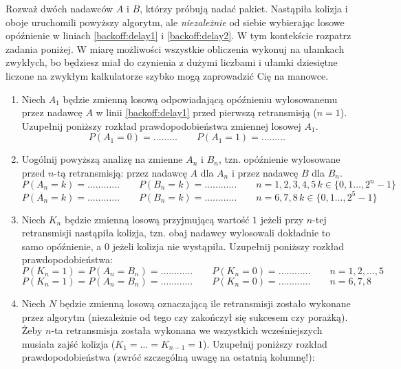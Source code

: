 \documentclass[twoside]{mwart}
\newcommand{\ans}[1]{}
\newenvironment{ansenv}{\comment}{\endcomment}
\newenvironment{ansenv}{\paragraph{Odpowiedź:}}{}
\newcommand{\ans}[1]{\begin{ansenv}#1\end{ansenv}}
\begin{document}
Rozważ dwóch nadawców $A$ i $B$, którzy próbują nadać pakiet.
Nastąpiła kolizja i oboje uruchomili powyższy algorytm, ale \emph{niezależnie} od siebie wybierając losowe opóźnienie w liniach \ref{backoff:delay1} i \ref{backoff:delay2}.
W tym kontekście rozpatrz zadania poniżej.
W miarę możliwości wszystkie obliczenia wykonuj na ułamkach zwykłych, bo będziesz miał do czynienia z dużymi liczbami i ułamki dziesiętne liczone na zwykłym kalkulatorze szybko mogą zaprowadzić Cię na manowce.
\begin{enumerate}
\item Niech $A_1$ będzie zmienną losową odpowiadającą opóźnieniu wylosowanemu przez nadawcę $A$ w linii \ref{backoff:delay1} przed pierwszą retransmisją ($n=1$).
Uzupełnij poniższy rozkład prawdopodobieństwa zmiennej losowej $A_1$.
\[ P(A_1=0)=\ldots\ldots\ldots \qquad P(A_1=1)=\ldots\ldots\ldots \]
\ans{\[P(A_1=0)=P(A_1=1)=\frac{1}{2}\]}
\item Uogólnij powyższą analizę na zmienne $A_n$ i $B_n$, tzn. opóźnienie wylosowane przed $n$-tą retransmisją: przez nadawcę $A$ dla $A_n$ i przez nadawcę $B$ dla $B_n$.
\[ P(A_n=k)=\ldots\ldots\ldots\ldots \qquad P(B_n=k)=\ldots\ldots\ldots\ldots \qquad n=1, 2, 3, 4, 5\, k\in\{0, 1 \ldots, 2^n-1\} \]
\[ P(A_n=k)=\ldots\ldots\ldots\ldots \qquad P(B_n=k)=\ldots\ldots\ldots\ldots \qquad n=6, 7, 8\, k\in\{0, 1 \ldots, 2^5-1\} \]
\ans{
	\[P(A_n=k)=P(B_n=k)=\frac{1}{2^n} \quad n\leq 5 \]
	\[P(A_n=k)=P(B_n=k)=\frac{1}{2^5} \quad n> 5 \]
}
\item Niech $K_n$ będzie zmienną losową przyjmującą wartość $1$ jeżeli przy $n$-tej retransmisji nastąpiła kolizja, tzn. obaj nadawcy wylosowali dokładnie to samo opóźnienie, a $0$ jeżeli kolizja nie wystąpiła.
Uzupełnij poniższy rozkład prawdopodobieństwa:
\[ P(K_n=1)=P(A_n=B_n)=\ldots\ldots\ldots\ldots \qquad P(K_n=0)=\ldots\ldots\ldots\ldots \qquad n=1, 2, \ldots, 5\]
\[ P(K_n=1)=P(A_n=B_n)=\ldots\ldots\ldots\ldots \qquad P(K_n=0)=\ldots\ldots\ldots\ldots \qquad n=6, 7, 8\]
\ans{
	\[ P(K_n=1)=P(A_n=B_n) = \sum_{k=0}^{2^n-1} P(A_n=k, B_n=k) = \sum_{k=0}^{2^n-1} P(A_n=k) P(B_n=k) = \frac{1}{2^n} \]
}
\item Niech $N$ będzie zmienną losową oznaczającą ile retransmisji zostało wykonane przez algorytm (niezależnie od tego czy zakończył się sukcesem czy porażką).
Żeby $n$-ta retransmisja została wykonana we wszystkich wcześniejszych musiała zajść kolizja ($K_1=\ldots=K_{n-1}=1$).
Uzupełnij poniższy rozkład prawdopodobieństwa (zwróć szczególną uwagę na ostatnią kolumnę!):\\

\end{enumerate}
\end{document}
